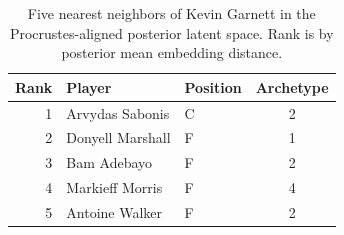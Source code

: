 \begin{table}[htbp]
  \centering\small
  \begin{tabular}{rllc}
    \toprule
    Rank & Player & Position & Archetype \\
    \midrule
    1 & Arvydas Sabonis & C & 2 \\
    2 & Donyell Marshall & F & 1 \\
    3 & Bam Adebayo & F & 2 \\
    4 & Markieff Morris & F & 4 \\
    5 & Antoine Walker & F & 2 \\
    \bottomrule
  \end{tabular}
  \caption{Five nearest neighbors of Kevin Garnett in the Procrustes-aligned posterior latent space. Rank is by posterior mean embedding distance.}
  \label{tab:Kevin_Garnett_neighbors}
\end{table}


